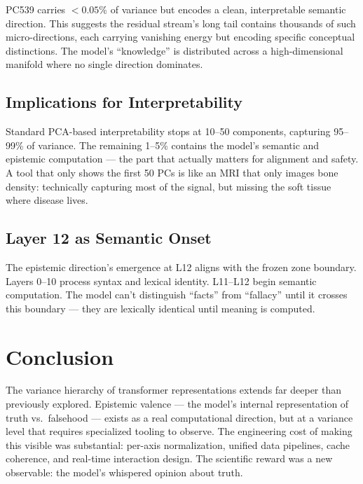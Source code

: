 \documentclass[11pt,a4paper]{article}
\begin{document}
PC539 carries $<0.05\%$ of variance but encodes a clean, interpretable semantic direction. This suggests the residual stream's long tail contains thousands of such micro-directions, each carrying vanishing energy but encoding specific conceptual distinctions. The model's ``knowledge'' is distributed across a high-dimensional manifold where no single direction dominates.

\subsection{Implications for Interpretability}

Standard PCA-based interpretability stops at 10--50 components, capturing 95--99\% of variance. The remaining 1--5\% contains the model's semantic and epistemic computation --- the part that actually matters for alignment and safety. A tool that only shows the first 50 PCs is like an MRI that only images bone density: technically capturing most of the signal, but missing the soft tissue where disease lives.

\subsection{Layer 12 as Semantic Onset}

The epistemic direction's emergence at L12 aligns with the frozen zone boundary. Layers 0--10 process syntax and lexical identity. L11--L12 begin semantic computation. The model can't distinguish ``facts'' from ``fallacy'' until it crosses this boundary --- they are lexically identical until meaning is computed.

\section{Conclusion}

The variance hierarchy of transformer representations extends far deeper than previously explored. Epistemic valence --- the model's internal representation of truth vs.\ falsehood --- exists as a real computational direction, but at a variance level that requires specialized tooling to observe. The engineering cost of making this visible was substantial: per-axis normalization, unified data pipelines, cache coherence, and real-time interaction design. The scientific reward was a new observable: the model's whispered opinion about truth.
\end{document}
